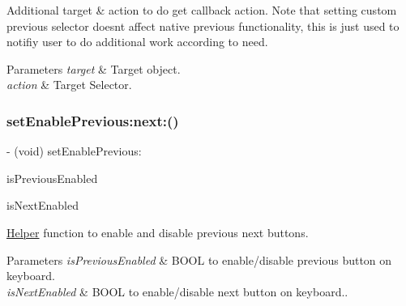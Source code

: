 Additional target \& action to do get callback action. Note that setting custom {\ttfamily previous} selector doesn\textquotesingle{}t affect native {\ttfamily previous} functionality, this is just used to notifiy user to do additional work according to need.


\begin{DoxyParams}{Parameters}
{\em target} & Target object. \\
\hline
{\em action} & Target Selector. \\
\hline
\end{DoxyParams}
\mbox{\label{category_u_i_view_07_i_q_toolbar_addition_08_af67c004fb5a380228b408ec07c9eca2c}} 
\subsubsection{\texorpdfstring{set\+Enable\+Previous\+:next\+:()}{setEnablePrevious:next:()}\hspace{0.1cm}{\footnotesize\ttfamily [1/3]}}
{\footnotesize\ttfamily -\/ (void) set\+Enable\+Previous\+: \begin{DoxyParamCaption}\item[{(B\+O\+OL)}]{is\+Previous\+Enabled }\item[{next:(B\+O\+OL)}]{is\+Next\+Enabled }\end{DoxyParamCaption}}

\mbox{\hyperlink{interface_helper}{Helper}} function to enable and disable previous next buttons.


\begin{DoxyParams}{Parameters}
{\em is\+Previous\+Enabled} & B\+O\+OL to enable/disable previous button on keyboard. \\
\hline
{\em is\+Next\+Enabled} & B\+O\+OL to enable/disable next button on keyboard.. \\
\hline
\end{DoxyParams}
\mbox{\label{category_u_i_view_07_i_q_toolbar_addition_08_af67c004fb5a380228b408ec07c9eca2c}} 
